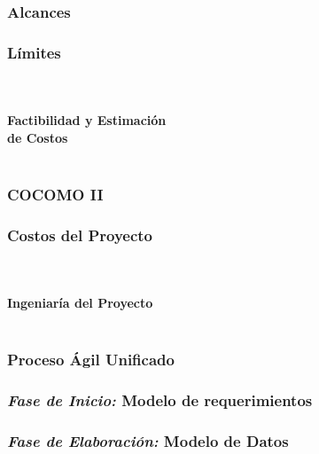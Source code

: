 \documentclass[xcolor=dvipsnames]{beamer}
\begin{document}
\begin{frame}
    \frametitle{Alcances}
\end{frame}

\begin{frame}
    \frametitle{Límites}
\end{frame}

\begin{frame}
    \centering\color{color3}{\rule{10cm}{5pt}}\\
    \vspace{-3mm}
    \centering\color{color3}{\rule{10cm}{1.5pt}}\\
    \vspace{2mm}
    \centering\textbf{\huge{\textcolor{color1}{Factibilidad y Estimación\\ de Costos}}}\\
    \centering\color{color3}{\rule{10cm}{1.5pt}}\\
\end{frame}

\begin{frame}
    \frametitle{COCOMO II}
\end{frame}

\begin{frame}
    \frametitle{Costos del Proyecto}
\end{frame}

\begin{frame}
    \centering\color{color3}{\rule{10cm}{5pt}}\\
    \vspace{-3mm}
    \centering\color{color3}{\rule{10cm}{1.5pt}}\\
    \vspace{2mm}
    \centering\textbf{\huge{\textcolor{color1}{Ingeniaría del Proyecto}}}\\
    \centering\color{color3}{\rule{10cm}{1.5pt}}\\
\end{frame}

\begin{frame}
    \frametitle{Proceso Ágil Unificado}
\end{frame}

\begin{frame}
    \frametitle{\textit{Fase de Inicio:} Modelo de requerimientos}
\end{frame}

\begin{frame}
    \frametitle{\textit{Fase de Elaboración:} Modelo de Datos}
\end{frame}
\end{document}
